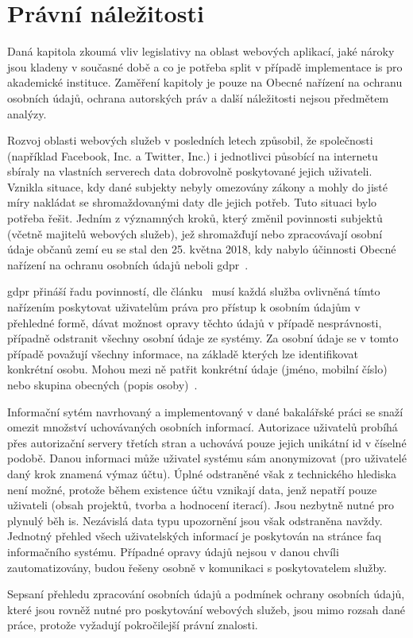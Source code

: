 \chapter{Právní náležitosti}

Daná kapitola zkoumá vliv legislativy na oblast webových aplikací, jaké nároky jsou kladeny v současné době a co je potřeba split v případě implementace \gls{is} pro akademické instituce. Zaměření kapitoly je pouze na Obecné nařízení na ochranu osobních údajů, ochrana autorských práv a další náležitosti nejsou předmětem analýzy.

Rozvoj oblasti webových služeb v posledních letech způsobil, že společnosti (například Facebook, Inc. a Twitter, Inc.) i jednotlivci působící na internetu sbíraly na vlastních serverech data dobrovolně poskytované jejich uživateli. Vznikla situace, kdy dané subjekty nebyly omezovány zákony a mohly do jisté míry nakládat se shromaždovanými daty dle jejich potřeb. Tuto situaci bylo potřeba řešit. Jedním z významných kroků, který změnil povinnosti subjektů (včetně majitelů webových služeb), jež shromažďují nebo zpracovávají osobní údaje občanů zemí \gls{eu} se stal den 25. května 2018, kdy nabylo účinnosti Obecné nařízení na ochranu osobních údajů neboli \gls{gdpr}~\cite{gdprDesc}. 

\gls{gdpr} přináší řadu povinností, dle článku~\cite{gdprPriprava} musí každá služba ovlivněná tímto nařízením poskytovat uživatelům práva pro přístup k osobním údajům v přehledné formě, dávat možnost opravy těchto údajů v případě nesprávnosti, případně odstranit všechny osobní údaje ze systémy. Za osobní údaje se v tomto případě považují všechny informace, na základě kterých lze identifikovat konkrétní osobu. Mohou mezi ně patřit konkrétní údaje (jméno, mobilní číslo) nebo skupina obecných (popis osoby)~\cite{gdprPrakticky}.

Informační sytém navrhovaný a implementovaný v dané bakalářské práci se snaží omezit množství uchovávaných osobních informací. Autorizace uživatelů probíhá přes autorizační servery třetích stran a uchovává pouze jejich unikátní \gls{id} v číselné podobě. Danou informaci může uživatel systému sám anonymizovat (pro uživatelé daný krok znamená výmaz účtu). Úplné odstraněné však z technického hlediska není možné, protože během existence účtu vznikají data, jenž nepatří pouze uživateli (obsah projektů, tvorba a hodnocení iterací). Jsou nezbytně nutné pro plynulý běh \gls{is}. Nezávislá data typu upozornění jsou však odstraněna navždy. Jednotný přehled všech uživatelských informací je poskytován na stránce \gls{faq} informačního systému. Případné opravy údajů nejsou v danou chvíli zautomatizovány, budou řešeny osobně v komunikaci s poskytovatelem služby.

Sepsaní přehledu zpracování osobních údajů a podmínek ochrany osobních údajů, které jsou rovněž nutné pro poskytování webových služeb, jsou mimo rozsah dané práce, protože vyžadují pokročilejší právní znalosti.